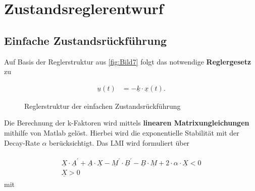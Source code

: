 \section{Zustandsreglerentwurf} \label{sec:Zustandsreglerentwurf}

\subsection{Einfache Zustandsrückführung} \label{sec:Einfach}

Auf Basis der Reglerstruktur aus \autoref{fig:Bild7} folgt das notwendige \textbf{Reglergesetz} zu

\begin{align}
    \underline{u}(t) &= -\underline{k}\cdot\underline{x}(t).
    \label{eq:Gleichung19}
\end{align}

\begin{figure}[H]
   \centering
   \caption[Reglerstruktur der einfache Zustandsrückführung]{Reglerstruktur der einfachen Zustandsrückführung}
   \label{fig:Bild7}
\end{figure}

Die Berechnung der k-Faktoren wird mittels \textbf{linearen Matrixungleichungen} mithilfe von Matlab gelöst. Hierbei wird die exponentielle Stabilität mit der Decay-Rate $\alpha$ berücksichtigt. Das LMI wird formuliert über

\begin{align}
        \begin{split}
        \underline{X}\cdot \underline{A}^'+\underline{A}\cdot\underline{X} -\underline{M}^'\cdot\underline{B}^' - \underline{B}\cdot \underline{M} +2\cdot\alpha\cdot \underline{X} < 0 \\
    \underline{X} > 0
    \end{split}
    \label{eq:Gleichung20}
\end{align}
\newline
mit

